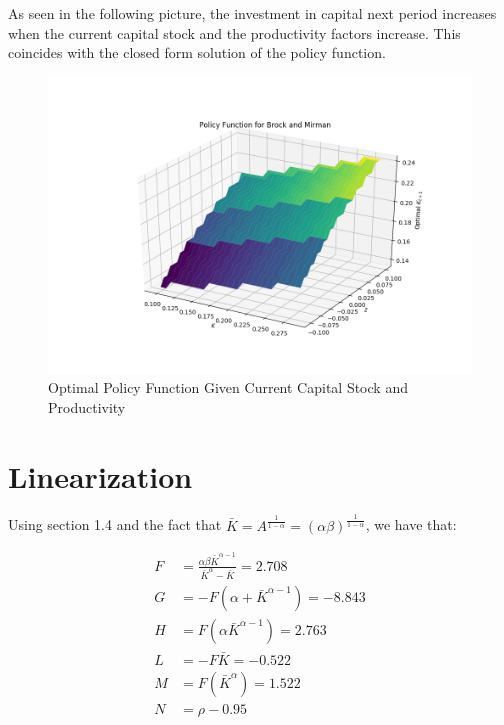 \documentclass[letterpaper,11pt]{article}
\theoremstyle{definition}
\begin{document}
\begin{spacing}{1.5}
	\setcounter{Exercise}{7}
	\begin{Exercise} \label{DSGE_HW_BM_Grid}
		As seen in the following picture, the investment in capital next period increases when the current capital stock and the productivity factors increase. This coincides with the closed form solution of the policy function.

		\begin{figure}[H]
			\caption{Optimal Policy Function Given Current Capital Stock and Productivity}
			\label{fig:brock_and_mirman}
			\includegraphics[width=\textwidth]{Brock_and_Merman_policy.png}
		\end{figure}
	\end{Exercise}

\section*{Linearization}\label{Linear_HW}

	\setcounter{Exercise}{0}
	\begin{Exercise} \label{Linear_HW_BM_Coeffs}
		Using section 1.4 and the fact that $\bar{K} = A^{\frac{1}{1-\alpha}} = (\alpha\beta)^{\frac{1}{1-\alpha}}$, we have that:

		\begin{align*}
			F &= \frac{\alpha\beta\bar{K}^{\alpha-1}}{\bar{K}^\alpha-\bar{K}} = 2.708 \\
			G &= -F(\alpha+\bar{K}^{\alpha-1}) = -8.843 \\
			H &= F(\alpha\bar{K}^{\alpha-1}) = 2.763 \\
			L &= -F\bar{K} = -0.522\\
			M &= F(\bar{K}^\alpha) = 1.522 \\
			N &= \rho - 0.95
		\end{align*}


\end{Exercise}
\end{spacing}
\end{document}
